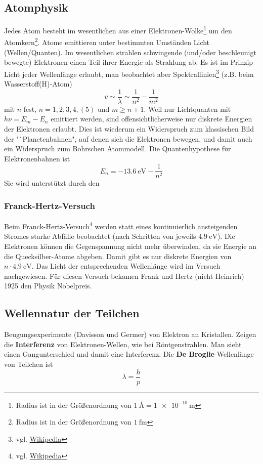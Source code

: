 \documentclass[oneside]{book}
\theoremstyle{definition}
\begin{document}
\subsection{Atomphysik}
Jedes Atom besteht im wesentlichen aus einer Elektronen-Wolke\footnote{Radius ist in der Größenordnung von $\SI{1}{\angstrom} = \SI{1e-10}{\meter}$} um den Atomkern\footnote{Radius ist in der Größenordnung von $\SI{1}{\femto\meter}$}. Atome emittieren unter bestimmten Umständen Licht (Wellen/Quanten). Im wesentlichen strahlen schwingende (und/oder beschleunigt bewegte) Elektronen einen Teil ihrer Energie als Strahlung ab.
Es ist im Prinzip Licht jeder Wellenlänge erlaubt, man beobachtet aber Spektrallinien\footnote{vgl. \href{https://de.wikipedia.org/wiki/Spektrallinie}{Wikipedia}} (z.B. beim Wasserstoff(H)-Atom)
$$v \sim \frac1\lambda \sim \frac{1}{n^2} - \frac{1}{m^2}$$
mit $n$ fest, $n = 1, 2, 3, 4, (5)$ und $m \geq n + 1$. Weil nur Lichtquanten mit $h \nu = E_m - E_n$ emittiert werden, sind offensichtlicherweise nur diskrete Energien der Elektronen erlaubt. Dies ist wiederum ein Widerspruch zum klassischen Bild der "`Planetenbahnen", auf denen sich die Elektronen bewegen, und damit auch ein Widerspruch zum Bohrschen Atommodell. Die Quantenhypothese für Elektronenbahnen ist 
$$E_n = \SI{-13.6}{\electronvolt} - \frac{1}{n^2}$$ 
Sie wird unterstützt durch den

\subsubsection{Franck-Hertz-Versuch}
Beim Franck-Hertz-Versuch\footnote{vgl. \href{https://de.wikipedia.org/wiki/Franck-Hertz-Versuch}{Wikipedia}} werden statt eines kontinuierlich ansteigenden Stromes starke Abfälle beobachtet (nach Schritten von jeweils $\SI{4.9}{\electronvolt}$). Die Elektronen können die Gegenspannung nicht mehr überwinden, da sie Energie an die Quecksilber-Atome abgeben. Damit gibt es nur diskrete Energien von $n \cdot \SI{4.9}{\electronvolt}$. Das Licht der entsprechenden Wellenlänge wird im Versuch nachgewiesen. Für diesen Versuch bekamen Frank und Hertz (nicht Heinrich) 1925 den Physik Nobelpreis.

\subsection{Wellennatur der Teilchen}
Beugungsexperimente (Davisson und Germer) von Elektron an Kristallen. Zeigen die \textbf{Interferenz} von Elektronen-Wellen, wie bei Röntgenstrahlen. Man sieht einen Gangunterschied und damit eine Interferenz. Die \textbf{De Broglie}-Wellenlänge von Teilchen ist
$$\lambda = \frac{h}{p}$$
\end{document}
